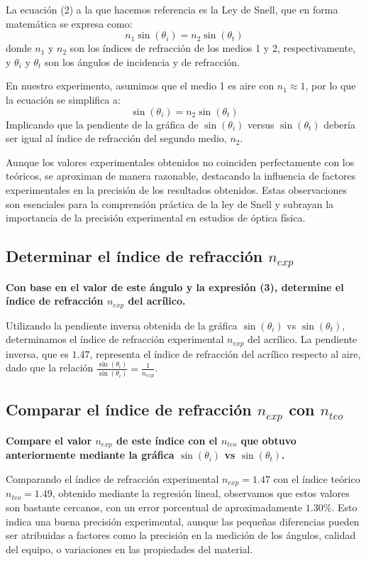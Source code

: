 La ecuación (2) a la que hacemos referencia es la Ley de Snell, que en forma matemática se expresa como:
\[
n_1 \sin(\theta_i) = n_2 \sin(\theta_t)
\]
donde \(n_1\) y \(n_2\) son los índices de refracción de los medios 1 y 2, respectivamente, y \(\theta_i\) y \(\theta_t\) son los ángulos de incidencia y de refracción.

En nuestro experimento, asumimos que el medio 1 es aire con \(n_1 \approx 1\), por lo que la ecuación se simplifica a:
\[
\sin(\theta_i) = n_2 \sin(\theta_t)
\]
Implicando que la pendiente de la gráfica de \(\sin(\theta_i)\) versus \(\sin(\theta_t)\) debería ser igual al índice de refracción del segundo medio, \(n_2\).

Aunque los valores experimentales obtenidos no coinciden perfectamente con los teóricos, se aproximan de manera razonable, destacando la influencia de factores experimentales en la precisión de los resultados obtenidos. Estas observaciones son esenciales para la comprensión práctica de la ley de Snell y subrayan la importancia de la precisión experimental en estudios de óptica física.

\subsection{Determinar el índice de refracción $n_{exp}$}
\textbf{Con base en el valor de este ángulo y la expresión (3), determine el índice de
refracción $n_{exp}$ del acrílico.}

Utilizando la pendiente inversa obtenida de la gráfica $\sin(\theta_i)$ vs $\sin(\theta_t)$, determinamos el índice de refracción experimental $n_{exp}$ del acrílico. La pendiente inversa, que es $1.47$, representa el índice de refracción del acrílico respecto al aire, dado que la relación $\frac{\sin(\theta_t)}{\sin(\theta_i)} = \frac{1}{n_{exp}}$.

\subsection{Comparar el índice de refracción $n_{exp}$ con $n_{teo}$}
\textbf{Compare el valor  $n_{exp}$ de este índice con el $n_{teo}$ que obtuvo anteriormente
mediante la gráfica \(\sin(\theta_i)\) vs \(\sin(\theta_t)\).}

Comparando el índice de refracción experimental $n_{exp} = 1.47$ con el índice teórico $n_{teo} = 1.49$, obtenido mediante la regresión lineal, observamos que estos valores son bastante cercanos, con un error porcentual de aproximadamente $1.30\%$. Esto indica una buena precisión experimental, aunque las pequeñas diferencias pueden ser atribuidas a factores como la precisión en la medición de los ángulos, calidad del equipo, o variaciones en las propiedades del material.

